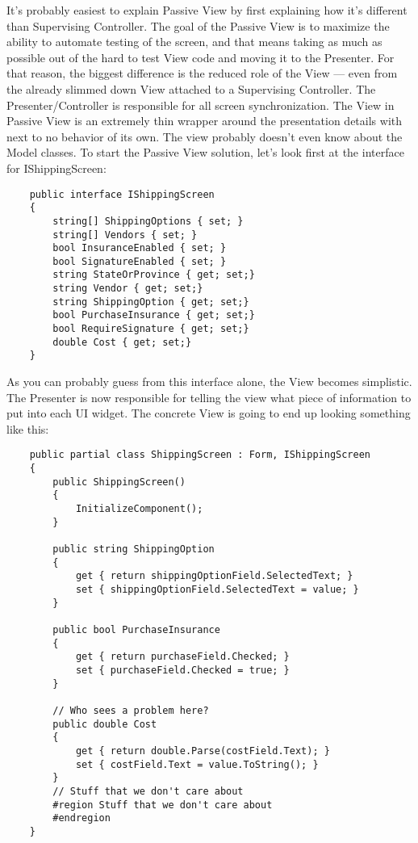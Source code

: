 \documentclass{article}
\begin{document}
{It's probably easiest to explain Passive View by first explaining how it's different than Supervising Controller.  The goal of the Passive View is to maximize the ability to automate testing of the screen, and that means taking as much as possible out of the hard to test View code and moving it to the Presenter.  For that reason, the biggest difference is the reduced role of the View — even from the already slimmed down View attached to a Supervising Controller.  The Presenter/Controller is responsible for all screen synchronization.  The View in Passive View is an extremely thin wrapper around the presentation details with next to no behavior of its own.  The view probably doesn't even know about the Model classes.  To start the Passive View solution, let's look first at the interface for IShippingScreen:
\newpage
\begin{lstlisting}
    public interface IShippingScreen
    {
        string[] ShippingOptions { set; }
        string[] Vendors { set; }
        bool InsuranceEnabled { set; }
        bool SignatureEnabled { set; }
        string StateOrProvince { get; set;}
        string Vendor { get; set;}
        string ShippingOption { get; set;}
        bool PurchaseInsurance { get; set;}
        bool RequireSignature { get; set;}
        double Cost { get; set;}
    }
\end{lstlisting}
	
As you can probably guess from this interface alone, the View becomes simplistic.  The Presenter is now responsible for telling the view what piece of information to put into each UI widget.  The concrete View is going to end up looking something like this:

\begin{lstlisting}
    public partial class ShippingScreen : Form, IShippingScreen
    {
        public ShippingScreen()
        {
            InitializeComponent();
        } 

        public string ShippingOption
        {
            get { return shippingOptionField.SelectedText; }
            set { shippingOptionField.SelectedText = value; }
        }

        public bool PurchaseInsurance
        {
            get { return purchaseField.Checked; }
            set { purchaseField.Checked = true; }
        }

        // Who sees a problem here?
        public double Cost
        {
            get { return double.Parse(costField.Text); }
            set { costField.Text = value.ToString(); }
        }
        // Stuff that we don't care about
        #region Stuff that we don't care about
        #endregion
    }
\end{lstlisting}

}
\end{document}
